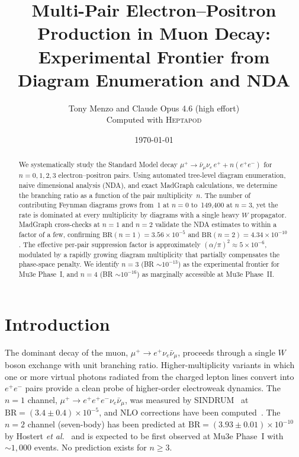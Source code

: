 \documentclass[11pt,a4paper]{article}
\title{Multi-Pair Electron--Positron Production in Muon Decay:\\
Experimental Frontier from Diagram Enumeration and NDA}
\author{Tony Menzo and Claude Opus 4.6 (high effort)\\[4pt]
\small Computed with \textsc{Heptapod}}
\date{\today}
\begin{document}
\maketitle

\begin{abstract}
We systematically study the Standard Model decay
$\mu^+ \to \bar\nu_\mu \nu_e \, e^+ + n(e^+e^-)$ for
$n = 0, 1, 2, 3$ electron--positron pairs.
Using automated tree-level diagram enumeration, naive dimensional analysis
(NDA), and exact MadGraph calculations, we determine the branching ratio
as a function of the pair multiplicity~$n$.
The number of contributing Feynman diagrams grows from~1 at $n=0$
to~149{,}400 at $n=3$, yet the rate is dominated at every multiplicity
by diagrams with a single heavy $W$ propagator.
MadGraph cross-checks at $n=1$ and $n=2$ validate the NDA estimates
to within a factor of a few, confirming
$\text{BR}(n\!=\!1) = 3.56\times10^{-5}$ and
$\text{BR}(n\!=\!2) = 4.34\times10^{-10}$.
The effective per-pair suppression factor is approximately
$(\alpha/\pi)^2 \approx 5\times10^{-6}$, modulated by a rapidly growing
diagram multiplicity that partially compensates the phase-space penalty.
We identify $n = 3$ (BR $\sim 10^{-13}$) as the experimental frontier
for Mu3e Phase~I, and $n = 4$ (BR $\sim 10^{-16}$) as marginally
accessible at Mu3e Phase~II.
\end{abstract}

\section{Introduction}
\label{sec:intro}

The dominant decay of the muon,
$\mu^+ \to e^+ \nu_e \bar\nu_\mu$, proceeds through a single
$W$ boson exchange with unit branching ratio.
Higher-multiplicity variants in which one or more virtual photons
radiated from the charged lepton lines convert into
$e^+e^-$ pairs provide a clean probe of higher-order electroweak
dynamics.
The $n=1$ channel,
$\mu^+ \to e^+e^+e^- \nu_e \bar\nu_\mu$,
was measured by SINDRUM~\cite{sindrum} at
$\text{BR} = (3.4 \pm 0.4)\times10^{-5}$,
and NLO corrections have been computed~\cite{pruna,fael}.
The $n=2$ channel (seven-body) has been predicted at
$\text{BR} = (3.93 \pm 0.01)\times10^{-10}$ by
Hostert \textit{et al.}~\cite{hostert} and is expected to be
first observed at Mu3e Phase~I with $\sim\!1{,}000$ events.
No prediction exists for $n \geq 3$.
\end{document}
